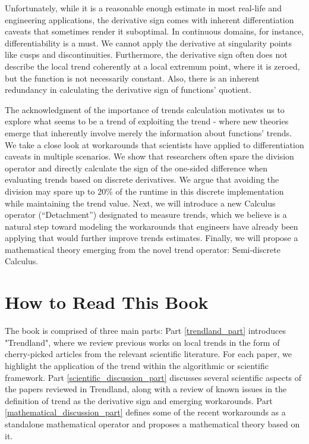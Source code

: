 \documentclass[11pt]{book}
\begin{document}
Unfortunately, while it is a reasonable enough estimate in most real-life
and engineering applications, the derivative sign comes with inherent
differentiation caveats that sometimes render it suboptimal. In continuous
domains, for instance, differentiability is a must. We cannot apply
the derivative at singularity points like cusps and discontinuities.
Furthermore, the derivative sign often does not describe the local
trend coherently at a local extremum point, where it is zeroed, but
the function is not necessarily constant. Also, there is an inherent
redundancy in calculating the derivative sign of functions' quotient.

The acknowledgment of the importance of trends calculation motivates
us to explore what seems to be a trend of exploiting the trend - where
new theories emerge that inherently involve merely the information
about functions' trends. We take a close look at workarounds that
scientists have applied to differentiation caveats in multiple scenarios.
We show that researchers often spare the division operator and directly
calculate the sign of the one-sided difference when evaluating trends
based on discrete derivatives. We argue that avoiding the division
may spare up to 20\% of the runtime in this discrete implementation
while maintaining the trend value. Next, we will introduce a new Calculus
operator (“Detachment”) designated to measure trends, which we believe
is a natural step toward modeling the workarounds that engineers have
already been applying that would further improve trends estimates.
Finally, we will propose a mathematical theory emerging from the novel
trend operator: Semi-discrete Calculus.

\section{How to Read This Book}

The book is comprised of three main parts: Part \ref{trendland_part}
introduces "Trendland", where we review previous works on local
trends in the form of cherry-picked articles from the relevant scientific
literature. For each paper, we highlight the application of the trend
within the algorithmic or scientific framework. Part \ref{scientific_discussion_part}
discusses several scientific aspects of the papers reviewed in Trendland,
along with a review of known issues in the definition of trend as
the derivative sign and emerging workarounds. Part \ref{mathematical_discussion_part}
defines some of the recent workarounds as a standalone mathematical
operator and proposes a mathematical theory based on it.
\end{document}
